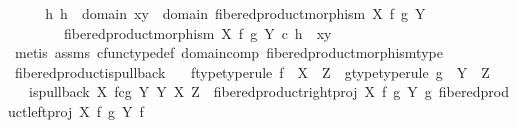 \begin{isabellebody}
\ \ \isamarkupfalse%
\ \isamarkupfalse%
\ {\isachardoublequoteopen}{\isasymexists}h{\isachardot}{\kern0pt}\ h\ {\isacharcolon}{\kern0pt}\ domain\ {\isasymlangle}x{\isacharcomma}{\kern0pt}y{\isasymrangle}\ {\isasymrightarrow}\ domain\ {\isacharparenleft}{\kern0pt}fibered{\isacharunderscore}{\kern0pt}product{\isacharunderscore}{\kern0pt}morphism\ X\ f\ g\ Y{\isacharparenright}{\kern0pt}\ {\isasymand}\isanewline
\ \ \ \ \ \ \ \ fibered{\isacharunderscore}{\kern0pt}product{\isacharunderscore}{\kern0pt}morphism\ X\ f\ g\ Y\ {\isasymcirc}\isactrlsub c\ h\ {\isacharequal}{\kern0pt}\ {\isasymlangle}x{\isacharcomma}{\kern0pt}y{\isasymrangle}{\isachardoublequoteclose}\isanewline
\ \ \ \ \isamarkupfalse%
\ {\isacharparenleft}{\kern0pt}metis\ assms{\isacharparenleft}{\kern0pt}{}{\isacharcomma}{\kern0pt}{}{\isacharparenright}{\kern0pt}\ cfunc{\isacharunderscore}{\kern0pt}type{\isacharunderscore}{\kern0pt}def\ domain{\isacharunderscore}{\kern0pt}comp\ fibered{\isacharunderscore}{\kern0pt}product{\isacharunderscore}{\kern0pt}morphism{\isacharunderscore}{\kern0pt}type{\isacharparenright}{\kern0pt}\isanewline
{}\isamarkupfalse%
%
\endisatagproof
{\isafoldproof}%
%
\isadelimproof
\isanewline
%
\endisadelimproof
\isanewline
{}\isamarkupfalse%
\ fibered{\isacharunderscore}{\kern0pt}product{\isacharunderscore}{\kern0pt}is{\isacharunderscore}{\kern0pt}pullback{\isacharcolon}{\kern0pt}\isanewline
\ \ \ f{\isacharunderscore}{\kern0pt}type{\isacharbrackleft}{\kern0pt}type{\isacharunderscore}{\kern0pt}rule{\isacharbrackright}{\kern0pt}{\isacharcolon}{\kern0pt}\ {\isachardoublequoteopen}f\ {\isacharcolon}{\kern0pt}\ X\ {\isasymrightarrow}\ Z{\isachardoublequoteclose}\ \ g{\isacharunderscore}{\kern0pt}type{\isacharbrackleft}{\kern0pt}type{\isacharunderscore}{\kern0pt}rule{\isacharbrackright}{\kern0pt}{\isacharcolon}{\kern0pt}\ {\isachardoublequoteopen}g\ {\isacharcolon}{\kern0pt}\ Y\ {\isasymrightarrow}\ Z{\isachardoublequoteclose}\isanewline
\ \ \ {\isachardoublequoteopen}is{\isacharunderscore}{\kern0pt}pullback\ {\isacharparenleft}{\kern0pt}X\ \isactrlbsub f\isactrlesub {\isasymtimes}\isactrlsub c\isactrlbsub g\isactrlesub \ Y{\isacharparenright}{\kern0pt}\ Y\ X\ Z\ \ {\isacharparenleft}{\kern0pt}fibered{\isacharunderscore}{\kern0pt}product{\isacharunderscore}{\kern0pt}right{\isacharunderscore}{\kern0pt}proj\ X\ f\ g\ Y{\isacharparenright}{\kern0pt}\ g\ {\isacharparenleft}{\kern0pt}fibered{\isacharunderscore}{\kern0pt}product{\isacharunderscore}{\kern0pt}left{\isacharunderscore}{\kern0pt}proj\ X\ f\ g\ Y{\isacharparenright}{\kern0pt}\ f{\isachardoublequoteclose}\isanewline

\end{isabellebody}
